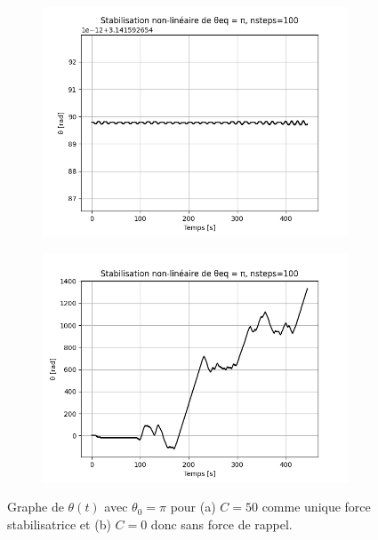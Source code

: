 \documentclass[a4paper,12pt,twoside]{article}
\begin{document}
\begin{figure}[H]
\centering
\begin{subfigure}{0.45\textwidth}  %
    \centering  %
    \includegraphics[scale=0.52]{graphes/facultatif_nsteps_100.png}
    \caption{}
    \label{fig9a}
\end{subfigure}
\hspace{0.05\textwidth}
\begin{subfigure}{0.45\textwidth}  %
    \centering  %
    \includegraphics[scale=0.52]{graphes/facultatif_C_0.png}
    \caption{}
    \label{fig9b}
\end{subfigure}
\captionsetup{justification=centering}
\caption{Graphe de $\theta(t)$ avec $\theta_0=\pi$ pour (a) $C=50$ comme unique force stabilisatrice et (b) $C=0$ donc sans force de rappel.}
\label{fig9}
\end{figure}
\end{document}
